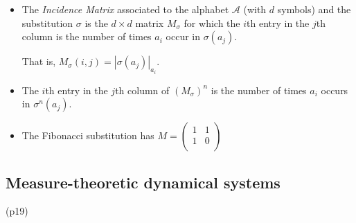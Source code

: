 \documentclass[a4paper,11pt]{amsart}
\begin{document}
\begin{itemize}
\item The \emph{Incidence Matrix}   associated to the alphabet $ \mathcal{A} $ (with $ d $ symbols) and the substitution $ \sigma $ is the $d \times d$ matrix $ M_\sigma  $ for which the $ i $th entry in the  $ j $th column is  the number of times $ a_i $ occur  in  $  \sigma (a_j) $.  

That is, $  M_\sigma(i,j) = | \sigma(a_j) |_{a_i} $.

\item The    $ i $th entry in the  $ j $th  column of $ (M_\sigma)^n  $ is the number of times $  a_i $ occurs in $  \sigma^n (a_j) $.

\item The Fibonacci substitution has $ M =    \begin{pmatrix}  
      1 & 1 \\
      1 & 0 \\
   \end{pmatrix}$ 
   
   
\end{itemize} 












\subsection{Measure-theoretic dynamical systems} (p19)
\end{document}
